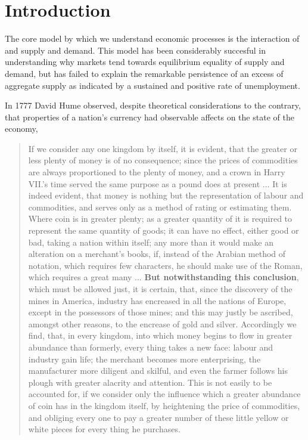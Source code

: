 
\chapter{Introduction}

The core model by which we understand economic processes is the interaction of and supply and
demand. This model has been considerably succesful in understanding why markets tend towards
equilibrium equality of supply and demand, but has failed to explain the remarkable persistence of
an excess of aggregate supply as indicated by a sustained and positive rate of unemployment.

In 1777 David Hume observed, despite theoretical considerations to the contrary, that properties of
a nation's currency had observable affects on the state of the economy,

\begin{quotation}
If we consider any one kingdom by itself, it is evident, that the greater or less plenty of money is
    of no consequence; since the prices of commodities are always proportioned to the plenty of
    money, and a crown in Harry VII.’s time served the same purpose as a pound does at present ...
    It is indeed evident, that money is nothing but the representation of labour and commodities,
    and serves only as a method of rating or estimating them. Where coin is in greater plenty; as a
    greater quantity of it is required to represent the same quantity of goods; it can have no
    effect, either good or bad, taking a nation within itself; any more than it would make an
    alteration on a merchant’s books, if, instead of the Arabian method of notation, which requires
    few characters, he should make use of the Roman, which requires a great many ... \textbf{But notwithstanding this conclusion}, which must be allowed just, it is certain, that, since the
    discovery of the mines in America, industry has encreased in all the nations of Europe, except
    in the possessors of those mines; and this may justly be ascribed, amongst other reasons, to the
    encrease of gold and silver.  Accordingly we find, that, in every kingdom, into which money
    begins to flow in greater abundance than formerly, every thing takes a new face: labour and
    industry gain life; the merchant becomes more enterprising, the manufacturer more diligent and
    skilful, and even the farmer follows his plough with greater alacrity and attention. This is not
    easily to be accounted for, if we consider only the influence which a greater abundance of coin
    has in the kingdom itself, by heightening the price of commodities, and obliging every one to
    pay a greater number of these little yellow or white pieces for every thing he purchases.
\end{quotation}

